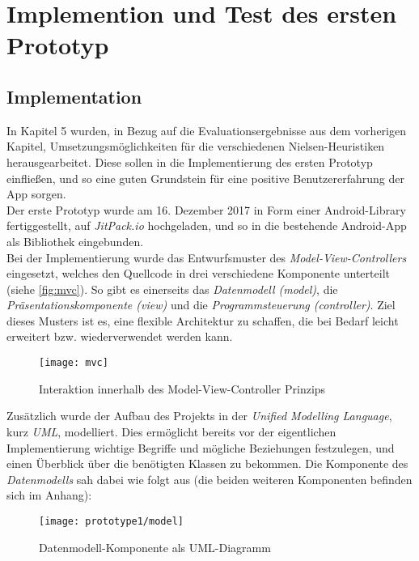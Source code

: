 \section{Implemention und Test des ersten Prototyp}

\subsection{Implementation}
In Kapitel 5 wurden, in Bezug auf die Evaluationsergebnisse aus dem vorherigen Kapitel, Umsetzungsmöglichkeiten für die verschiedenen Nielsen-Heuristiken herausgearbeitet.
Diese sollen in die Implementierung des ersten Prototyp einfließen, und so eine guten Grundstein für eine positive Benutzererfahrung der App sorgen. \\

Der erste Prototyp wurde am 16. Dezember 2017 in Form einer Android-Library fertiggestellt, auf \emph{JitPack.io} hochgeladen, und so in die bestehende Android-App als Bibliothek eingebunden. \\

Bei der Implementierung wurde das Entwurfsmuster des \emph{Model-View-Controllers} eingesetzt, welches den Quellcode in drei verschiedene Komponente unterteilt (siehe \autoref{fig:mvc}).
So gibt es einerseits das \emph{Datenmodell (model)}, die \emph{Präsentationskomponente (view)} und die \emph{Programmsteuerung (controller)}.
Ziel dieses Musters ist es, eine flexible Architektur zu schaffen, die bei Bedarf leicht erweitert bzw. wiederverwendet werden kann.

\begin{figure}[h]
  \centering
  \texttt{[image: mvc]}
  \caption{Interaktion innerhalb des Model-View-Controller Prinzips}
  \label{fig:mvc}
\end{figure}

\noindent
Zusätzlich wurde der Aufbau des Projekts in der \emph{Unified Modelling Language}, kurz \emph{UML}, modelliert.
Dies ermöglicht bereits vor der eigentlichen Implementierung wichtige Begriffe und mögliche Beziehungen festzulegen, und einen Überblick über die benötigten Klassen zu bekommen.
Die Komponente des \emph{Datenmodells} sah dabei wie folgt aus (die beiden weiteren Komponenten befinden sich im Anhang):

\begin{figure}[h]
  \centering
  \texttt{[image: prototype1/model]}
  \caption{Datenmodell-Komponente als UML-Diagramm}
  \label{fig:model1}
\end{figure}

